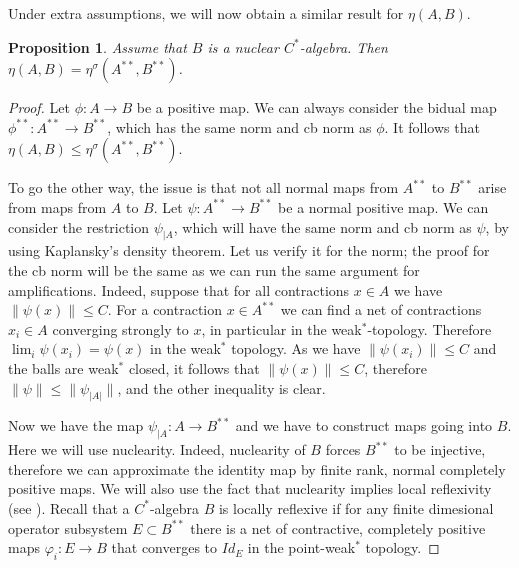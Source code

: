 \documentclass[11pt]{article}
\numberwithin{theorem}{section}
\newtheorem{prop}[theorem]{Proposition}
\begin{document}
Under extra assumptions, we will now obtain a similar result for $\eta(A,B)$.
\begin{prop}\label{prop:cbnormbidual}
Assume that $B$ is a nuclear $C^{\ast}$-algebra. Then $\eta(A,B) = \eta^{\sigma}(A^{\ast\ast}, B^{\ast\ast})$.    
\end{prop}
\begin{proof}
Let $\phi: A \to B$ be a positive map. We can always consider the bidual map $\phi^{\ast\ast}: A^{\ast\ast} \to B^{\ast\ast}$, which has the same norm and cb norm as $\phi$. It follows that $\eta(A,B)\leqslant \eta^{\sigma}(A^{\ast\ast}, B^{\ast\ast})$.

To go the other way, the issue is that not all normal maps from $A^{\ast\ast}$ to $B^{\ast\ast}$ arise from maps from $A$ to $B$. Let $\psi: A^{\ast\ast} \to B^{\ast\ast}$ be a normal positive map. We can consider the restriction $\psi_{|A}$, which will have the same norm and cb norm as $\psi$, by using Kaplansky's density theorem. Let us verify it for the norm; the proof for the cb norm will be the same as we can run the same argument for amplifications. Indeed, suppose that for all contractions $x\in A$ we have $\|\psi(x)\|\leqslant C$. For a contraction $x \in A^{\ast\ast}$ we can find a net of contractions $x_i \in A$ converging strongly to $x$, in particular in the weak$^{\ast}$-topology. Therefore $\lim_{i} \psi(x_i) = \psi(x)$ in the weak$^{\ast}$ topology. As we have $\|\psi(x_i)\|\leqslant C$ and the balls are weak$^{\ast}$ closed, it follows that $\|\psi(x)\|\leqslant C$, therefore $\|\psi\| \leqslant \|\psi_{|A|}\|$, and the other inequality is clear.

Now we have the map $\psi_{|A}: A \to B^{\ast\ast}$ and we have to construct maps going into $B$. Here we will use nuclearity. Indeed, nuclearity of $B$ forces $B^{\ast\ast}$ to be injective, therefore we can approximate the identity map by finite rank, normal completely positive maps. We will also use the fact that nuclearity implies local reflexivity (see \cite[Chapter 9: Theorem 3.1]{BrownOzawa}). Recall that a $C^{\ast}$-algebra $B$ is locally reflexive if for any finite dimesional operator subsystem $E \subset B^{\ast\ast}$ there is a net of contractive, completely positive maps $\varphi_{i}: E \to B$ that converges to $Id_{E}$ in the point-weak$^{\ast}$ topology.


\end{proof}
\end{document}
